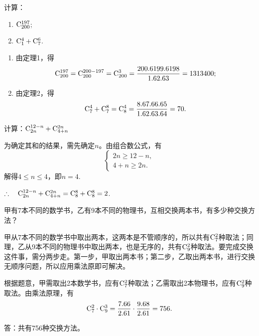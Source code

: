\begin{example}
    计算：
\begin{enumerate}[(1)]
    \item $\comb{200}{197}$;
\item $\comb{1}{4}+\comb{7}{6}$.
\end{enumerate}
\end{example}

\begin{solution}
\begin{enumerate}[(1)]
\item 由定理1，得
\[
\comb{200}{197}=\comb{200}{200-197}=\comb{200}{3}=\frac{200\x  199\x  198}{1\x  2\x  3}=1313400;
\]
    \item 由定理2，得
\[
\comb{7}{4}+\comb{7}{8}=\comb{8}{4}=\frac{8\x  7\x  6\x  5}{1\x  2\x  3\x  4}=70.\]
\end{enumerate}
\end{solution}
    
\begin{example}
    计算：$ \comb{2n}{12-n}+\comb{4+n}{2n}$
\end{example}

\begin{analyze}
    为确定其和的结果，需先确定$n$。由组合数公式，有
\[\begin{cases}
    2n\ge  12-n,\\
    4+n\ge  2n.
\end{cases}\]
解得$4\le  n\le  4$，即$n=4$.

$\therefore\quad \comb{2n}{12-n}+\comb{4+n}{2n}=\comb{8}{8}+\comb{8}{8}=2$.
\end{analyze}

\begin{example}
    甲有7本不同的数学书，乙有9本不同的物理书，互相交换两本书，有多少种交换方法？
\end{example}

\begin{analyze}
    甲从7本不同的数学书中取出两本，这两本是不管顺序的，所以共有$ \comb{7}{2} $种取法；同理，乙从9本不同的物理书中取出两本，也是无序的，共有$ \comb{9}{2} $种取法。要完成交换这件事，需分两步走。第一步，甲取出两本书；第二步，乙取出两本书，进行交换无顺序问题，所以应用乘法原即可解决。
\end{analyze}

\begin{solution}
根据题意，甲需取出2本数学书，应有$ \comb{7}{2} $种取法；乙需取出2本物理书，应有$ \comb{9}{2} $种取法。由乘法原理，有
\[
\comb{7}{2}\cdot  \comb{9}{3}=\frac{7\x  6}{2\x  1}\cdot \frac{9\x  8}{2\x  1}=756.\]

答：共有756种交换方法。    
\end{solution}

